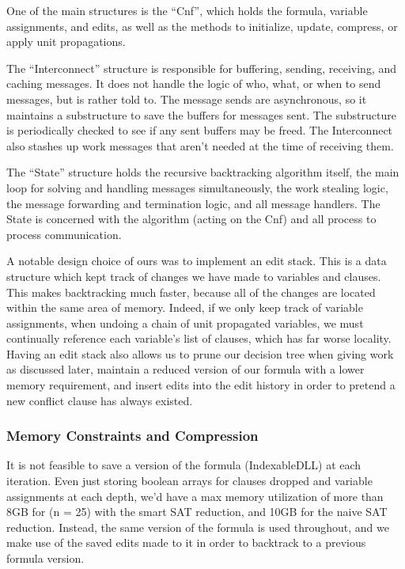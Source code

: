 \documentclass{article}
\begin{document}
One of the main structures is the ``Cnf'', which holds the formula, variable assignments, and edits, as well as the methods to initialize, update, compress, or apply unit propagations.

The ``Interconnect'' structure is responsible for buffering, sending, receiving, and caching messages. It does not handle the logic of who, what, or when to send messages, but is rather told to. The message sends are asynchronous, so it maintains a substructure to save the buffers for messages sent. The substructure is periodically checked to see if any sent buffers may be freed. The Interconnect also stashes up work messages that aren't needed at the time of receiving them.

The ``State'' structure holds the recursive backtracking algorithm itself, the main loop for solving and handling messages simultaneously, the work stealing logic, the message forwarding and termination logic, and all message handlers. The State is concerned with the algorithm (acting on the Cnf) and all process to process communication.

A notable design choice of ours was to implement an edit stack.
This is a data structure which kept track of changes we have made to variables and clauses.
This makes backtracking much faster, because all of the changes are located within the same area of memory. Indeed, if we only keep track of variable assignments, when undoing a chain of unit propagated variables, we must continually reference each variable's list of clauses, which has far worse locality. Having an edit stack also allows us to prune our decision tree when giving work as discussed later, maintain a reduced version of our formula with a lower memory requirement, and insert edits into the edit history in order to pretend a new conflict clause has always existed.

\subsubsection{Memory Constraints and Compression}

It is not feasible to save a version of the formula (IndexableDLL) at each iteration. Even just storing boolean arrays for clauses dropped and variable assignments at each depth, we'd have a max memory utilization of more than 8GB for (n = 25) with the smart SAT reduction, and 10GB for the naive SAT reduction. Instead, the same version of the formula is used throughout, and we make use of the saved edits made to it in order to backtrack to a previous formula version.
\end{document}
